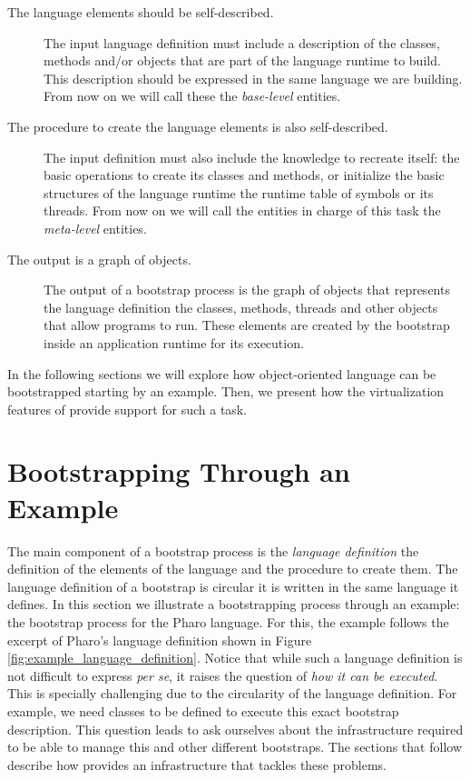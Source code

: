 \begin{description}

\item[The language elements should be self-described.] The input language definition must include a description of the classes, methods and/or objects that are part of the language runtime to build. This description should be expressed in the same language we are building. From now on we will call these the \emph{base-level} entities.

\item[The procedure to create the language elements is also self-described.] The input definition must also include the knowledge to recreate itself: the basic operations to create its classes and methods, or initialize the basic structures of the language runtime \eg the runtime table of symbols or its threads. From now on we will call the entities in charge of this task the \emph{meta-level} entities.

\item[The output is a graph of objects.] The output of a bootstrap process is the graph of objects that represents the language definition \ie the classes, methods, threads and other objects that allow programs to run. These elements are created by the bootstrap inside an application runtime for its execution. %

\end{description}

\noindent In the following sections we will explore how object-oriented language can be bootstrapped starting by an example. Then, we present how the virtualization features of \Vtt provide support for such a task.

\section{Bootstrapping Through an Example}\label{sec:bootstrapping_process}

The main component of a bootstrap process is the \emph{language definition} \ie the definition of the elements of the language and the procedure to create them. The language definition of a bootstrap is circular \ie it is written in the same language it defines. In this section we illustrate a bootstrapping process through an example: the bootstrap process for the Pharo language. For this, the example follows the excerpt of Pharo's language definition shown in Figure \ref{fig:example_language_definition}. Notice that while such a language definition is not difficult to express \emph{per se}, it raises the question of \emph{how it can be executed}. This is specially challenging due to the circularity of the language definition. For example, we need classes to be defined to execute this exact bootstrap description. This question leads to ask ourselves about the infrastructure required to be able to manage this and other different bootstraps. The sections that follow describe how \Vtt provides an infrastructure that tackles these problems.

